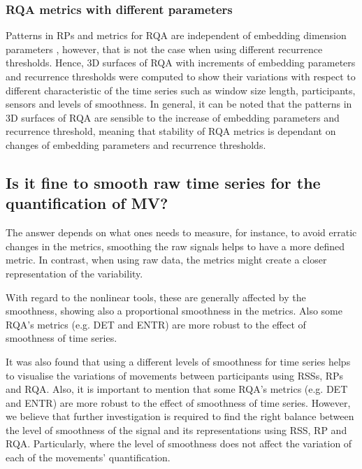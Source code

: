 \subsubsection{RQA metrics with different parameters}
Patterns in RPs and metrics for RQA are independent of embedding 
dimension parameters \citep{iwanski1998}, however, that is not the case 
when using different recurrence thresholds. 
Hence, 3D surfaces of RQA with increments of embedding parameters and
recurrence thresholds were computed to show their variations with respect 
to different characteristic of the time series such as window size length,
participants, sensors and levels of smoothness.
In general, it can be noted that the patterns in 3D surfaces of RQA 
are sensible to the increase of embedding parameters and recurrence threshold,
meaning that stability of RQA metrics is dependant on changes of 
embedding parameters and recurrence thresholds. 




\subsection{Is it fine to smooth raw time series for the quantification of MV?}

The answer depends on what ones needs to measure, for instance, to 
avoid erratic changes in the metrics, smoothing the raw signals helps
to have a more defined metric. In contrast, when using raw data, the 
metrics might create a closer representation of the variability.

With regard to the nonlinear tools, these are generally affected by the 
smoothness, showing also a proportional smoothness in the metrics.
Also some RQA's metrics (e.g. DET and  ENTR) are more robust to the 
effect of smoothness of time series.

It was also found that using a different levels of smoothness
for time series helps to visualise the variations of movements 
between participants using RSSs, RPs and RQA. Also, it is important to mention 
that some RQA's metrics (e.g. DET and  ENTR) are more robust 
to the effect of smoothness of time series.
However, we believe that further investigation is required to find the 
right balance between the level of smoothness of the signal
and its representations using RSS, RP and RQA.
Particularly, where the level of smoothness does not affect 
the variation of each of the movements' quantification.




